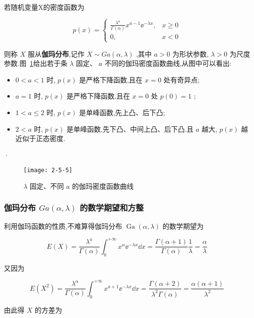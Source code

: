 若随机变量X的密度函数为

\begin{equation}
p(x)=\left\{\begin{array}{ll}{\frac{\lambda^{a}}{\Gamma(\alpha)} x^{a-1} \ee ^{-\lambda x},} & {x \geqslant 0} \\ {0,} & {x<0}\end{array}\right. \label{eq:2.5.12}
\end{equation}

则称 $ X $ 服从\textbf{伽玛分布},记作 $ X \sim G a(\alpha, \lambda) $ ,其中 $ a>0 $ 为形状参数, $ \lambda>0 $ 为尺度参数.图~\ref{fig:2.5.5}给出若于条 $ \lambda $ 固定、 $ a $ 不同的伽玛密度函数曲线,从图中可以看出:

\begin{itemize}
	\item $ 0<a<1 $ 时, $ p(x) $ 是严格下降函数,且在 $ x=0 $ 处有奇异点;
	\item $ a=1 $ 时, $ p(x) $ 是严格下降函数,且在 $ x=0 $ 处 $ p(0)=1 $ ;
	\item $ 1<a \leq 2 $ 时, $ p(x) $ 是单峰函数,先上凸、后下凸;
	\item $ 2<a $ 时, $ p(x) $ 是单峰函数,先下凸、中间上凸、后下凸.且 $ a $ 越大, $ p(x) $ 越近似于正态密度.
\end{itemize}
·
\begin{figure}
	\centering
	\texttt{[image: 2-5-5]}
	\caption{ $ \lambda $ 固定、不同 $ a $ 的伽玛密度函数曲线}
	\label{fig:2.5.5}
\end{figure}

\subsubsection{伽玛分布 $ G a(\alpha, \lambda) $ 的数学期望和方整}

利用伽玛函数的性质,不难算得伽玛分布 $ \operatorname{Ga}(\alpha, \lambda) $ 的数学期望为

\[
E(X)=\frac{\lambda^{a}}{\Gamma(\alpha)} \int_{0}^{+\infty} x^{\alpha} \ee ^{-\lambda x} \dd x=\frac{\Gamma(\alpha+1)}{\Gamma(\alpha)} \frac{1}{\lambda}=\frac{\alpha}{\lambda}
\]

又因为

\[
E\left(X^{2}\right)=\frac{\lambda^{\alpha}}{\Gamma(\alpha)} \int_{0}^{+\infty} x^{a+1} \ee ^{-\lambda x} \dd x=\frac{\Gamma(\alpha+2)}{\lambda^{2} \Gamma(\alpha)}=\frac{\alpha(\alpha+1)}{\lambda^{2}}
\]

由此得 $ X $ 的方差为

